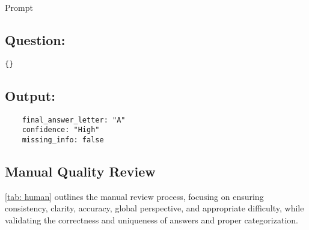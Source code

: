 \begin{promptbox}{Prompt}
\subsection*{Question:}
\begin{verbatim}
{}
\end{verbatim}

\subsection*{Output:}
\begin{verbatim}
    final_answer_letter: "A"
    confidence: "High"
    missing_info: false
\end{verbatim}

\end{promptbox}

\subsection{Manual Quality Review}
\label{Appendix: Manual Quality Review}

\autoref{tab: human} outlines the manual review process, focusing on ensuring consistency, clarity, accuracy, global perspective, and appropriate difficulty, while validating the correctness and uniqueness of answers and proper categorization.



\vspace{-5mm}
